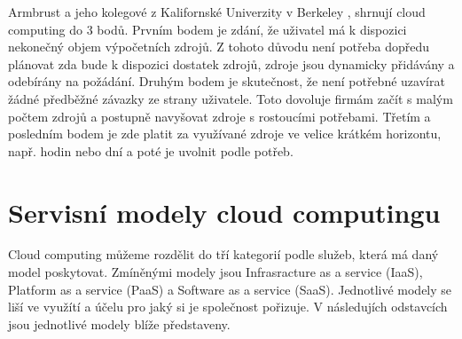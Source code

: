     Armbrust a jeho kolegové z Kalifornské Univerzity v Berkeley \cite{Ambrust2009}, shrnují cloud computing do 3 bodů. Prvním bodem je zdání, že uživatel má k dispozici nekonečný objem výpočetních zdrojů. Z tohoto důvodu není potřeba dopředu plánovat zda bude k dispozici dostatek zdrojů, zdroje jsou dynamicky přidávány a odebírány na požádání. Druhým bodem je skutečnost, že není potřebné uzavírat žádné předběžné závazky ze strany uživatele. Toto dovoluje firmám začít s malým počtem zdrojů a postupně navyšovat zdroje s rostoucími potřebami. Třetím a posledním bodem je zde platit za využívané zdroje ve velice krátkém horizontu, např. hodin nebo dní a poté je uvolnit podle potřeb.

\section{Servisní modely cloud computingu}
Cloud computing můžeme rozdělit do tří kategorií podle služeb, která má daný model poskytovat. Zmíněnými modely jsou Infrasracture as a service (IaaS), Platform as a service (PaaS) a Software as a service (SaaS). Jednotlivé modely se liší ve využítí a účelu pro jaký si je společnost pořizuje. V následujích odstavcích jsou jednotlivé modely blíže představeny. 

